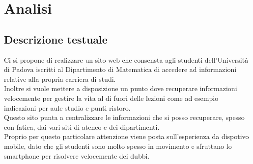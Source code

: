 \section{Analisi}
\subsection{Descrizione testuale}

Ci si propone di realizzare un sito web che consensta agli studenti dell'Università di Padova iscritti al Dipartimento di Matematica di accedere ad informazioni relative alla propria carriera di studi.\\
Inoltre si vuole mettere a disposizione un punto dove recuperare informazioni velocemente per gestire la vita al di fuori delle lezioni come ad 
esempio indicazioni per aule studio e punti ristoro.\\
Questo sito punta a centralizzare le informazioni che si posso recuperare, spesso con fatica, dai vari siti di ateneo e dei dipartimenti.\\
Proprio per questo particolare attenzione viene posta sull'esperienza da dispotivo mobile, dato che gli studenti sono molto spesso in movimento e sfruttano lo smartphone per risolvere velocemente dei dubbi.

